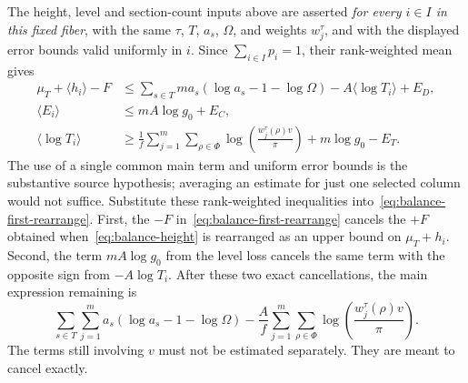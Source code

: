 \documentclass[11pt,openany,oneside]{scrbook}
\theoremstyle{definition}
\theoremstyle{remark}
\begin{document}
The height, level and section-count inputs above are asserted \emph{for every $i\in I$ in this fixed fiber}, with the same $\tau$, $T$, $a_s$, $\Omega$, and weights $w_j^\tau$, and with the displayed error bounds valid uniformly in $i$. Since $\sum_{i\in I}p_i=1$, their rank-weighted mean gives
\[
\begin{aligned}
\mu_T+\langle h_i\rangle-F &\le \sum_{s\in T}m a_s(\log a_s-1-\log\Omega)-A\langle\log T_i\rangle+E_D,\\
\langle E_i\rangle &\le mA\log g_0+E_C,\\
\langle\log T_i\rangle &\ge \frac1f\sum_{j=1}^m\sum_{\rho\in\Phi}\log\left(\frac{w_j^\tau(\rho)v}{\pi}\right)+m\log g_0-E_T.
\end{aligned}
\]
The use of a single common main term and uniform error bounds is the substantive source hypothesis; averaging an estimate for just one selected column would not suffice. Substitute these rank-weighted inequalities into~\eqref{eq:balance-first-rearrange}. First, the $-F$ in~\eqref{eq:balance-first-rearrange} cancels the $+F$ obtained when~\eqref{eq:balance-height} is rearranged as an upper bound on $\mu_T+h_i$.  Second, the term $mA\log g_0$ from the level loss cancels the same term with the opposite sign from $-A\log T_i$.  After these two exact cancellations, the main expression remaining is
\begin{equation}\label{eq:balance-main-unexpanded}
\sum_{s\in T}\sum_{j=1}^m a_s(\log a_s-1-\log\Omega)
-\frac{A}{f}\sum_{j=1}^m\sum_{\rho\in\Phi}
\log\left(\frac{w_j^\tau(\rho)v}{\pi}\right).
\end{equation}
The terms still involving $v$ must not be estimated separately.  They are meant to cancel exactly.
\end{document}
